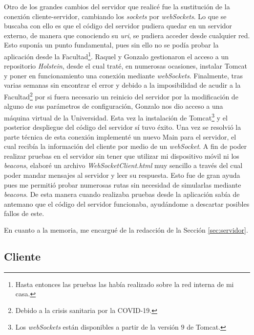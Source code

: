 Otro de los grandes cambios del servidor que realicé fue la sustitución de la conexión cliente-servidor, cambiando los \textit{sockets} por \textit{webSockets}. Lo que se buscaba con ello es que el código del servidor pudiera quedar en un servidor externo, de manera que conociendo su \textit{uri}, se pudiera acceder desde cualquier red. Esto suponía un punto fundamental, pues sin ello no se podía probar la aplicación desde la Facultad\footnote{Hasta entonces las pruebas las había realizado sobre la red interna de mi casa.}. Raquel y Gonzalo gestionaron el acceso a un repositorio \textit{Holstein}, desde el cual traté, en numerosas ocasiones, instalar Tomcat y poner en funcionamiento una conexión mediante \textit{webSockets}. Finalmente, tras varias semanas sin encontrar el error y debido a la imposibilidad de acudir a la Facultad\footnote{Debido a la crisis sanitaria por la COVID-19.} por si fuera necesario un reinicio del servidor por la modificación de alguno de sus parámetros de configuración, Gonzalo nos dio acceso a una máquina virtual de la Universidad. Esta vez la instalación de Tomcat\footnote{Los \textit{webSockets} están disponibles a partir de la versión $9$ de Tomcat.} y el posterior despliegue del código del servidor sí tuvo éxito. Una vez se resolvió la parte técnica de esta conexión implementé un nuevo Main para el servidor, el cual recibía la información del cliente por medio de un \textit{webSocket}. A fin de poder realizar pruebas en el servidor sin tener que utilizar mi dispositivo móvil ni los \textit{beacons}, elaboré un archivo \textit{WebSocketClient.html} muy sencillo a través del cual poder mandar mensajes al servidor y leer su respuesta. Esto fue de gran ayuda pues me permitió probar numerosas rutas sin necesidad de simularlas mediante \textit{beacons}. De esta manera cuando realizaba pruebas desde la aplicación sabía de antemano que el código del servidor funcionaba, ayudándome a descartar posibles fallos de este. 

En cuanto a la memoria, me encargué de la redacción de la Sección \ref{sec:servidor}.

\subsection{Cliente}

